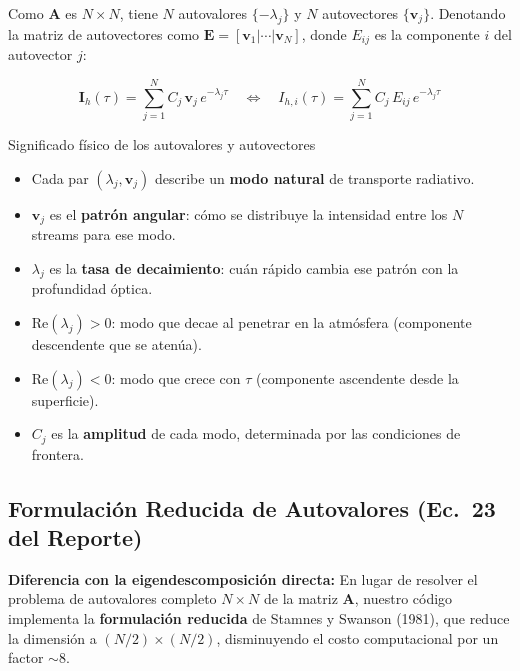 \documentclass[a4paper,11pt]{article}
\begin{document}
Como $\mathbf{A}$ es $N\times N$, tiene $N$ autovalores $\{-\lambda_j\}$ y $N$
autovectores $\{\mathbf{v}_j\}$.  Denotando la matriz de autovectores como
$\mathbf{E} = [\mathbf{v}_1|\cdots|\mathbf{v}_N]$, donde $E_{ij}$ es la componente
$i$ del autovector $j$:

\begin{equation}\label{eq:homogeneous}
    \mathbf{I}_h(\tau) = \sum_{j=1}^{N}C_j\,\mathbf{v}_j\,e^{-\lambda_j\tau}
    \quad\Longleftrightarrow\quad
    I_{h,i}(\tau) = \sum_{j=1}^{N}C_j\,E_{ij}\,e^{-\lambda_j\tau}
\end{equation}

\begin{physics}{Significado f\'isico de los autovalores y autovectores}
\begin{itemize}
    \item Cada par $(\lambda_j, \mathbf{v}_j)$ describe un \textbf{modo natural}
          de transporte radiativo.
    \item $\mathbf{v}_j$ es el \textbf{patr\'on angular}: c\'omo se distribuye
          la intensidad entre los $N$ streams para ese modo.
    \item $\lambda_j$ es la \textbf{tasa de decaimiento}: cu\'an r\'apido cambia
          ese patr\'on con la profundidad \'optica.
    \item $\text{Re}(\lambda_j) > 0$: modo que decae al penetrar
          en la atm\'osfera (componente descendente que se aten\'ua).
    \item $\text{Re}(\lambda_j) < 0$: modo que crece con $\tau$
          (componente ascendente desde la superficie).
    \item $C_j$ es la \textbf{amplitud} de cada modo, determinada por las
          condiciones de frontera.
\end{itemize}
\end{physics}


\subsection{Formulaci\'on Reducida de Autovalores (Ec.~23 del Reporte)}

\textbf{Diferencia con la eigendescomposici\'on directa:} En lugar de resolver
el problema de autovalores completo $N \times N$ de la matriz $\mathbf{A}$,
nuestro c\'odigo implementa la \textbf{formulaci\'on reducida} de Stamnes y
Swanson (1981), que reduce la dimensi\'on a $(N/2) \times (N/2)$, disminuyendo
el costo computacional por un factor $\sim 8$.
\end{document}
